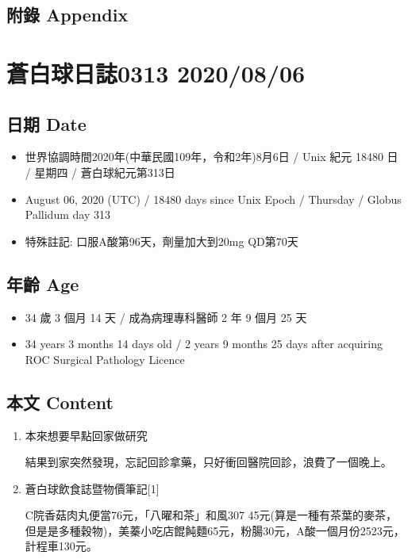 \documentclass[
]{article}
\providecommand{\tightlist}{%
  \setlength{\itemsep}{0pt}\setlength{\parskip}{0pt}}
\begin{document}
\hypertarget{ux9644ux9304-appendix-4}{%
\subsection{附錄 Appendix}\label{ux9644ux9304-appendix-4}}

\hypertarget{ux84bcux767dux7403ux65e5ux8a8c0313-20200806}{%
\section{蒼白球日誌0313
2020/08/06}\label{ux84bcux767dux7403ux65e5ux8a8c0313-20200806}}

\hypertarget{ux65e5ux671f-date-5}{%
\subsection{日期 Date}\label{ux65e5ux671f-date-5}}

\begin{itemize}
\tightlist
\item
  世界協調時間2020年(中華民國109年，令和2年)8月6日 / Unix 紀元 18480 日
  / 星期四 / 蒼白球紀元第313日
\item
  August 06, 2020 (UTC) / 18480 days since Unix Epoch / Thursday /
  Globus Pallidum day 313
\item
  特殊註記: 口服A酸第96天，劑量加大到20mg QD第70天
\end{itemize}

\hypertarget{ux5e74ux9f61-age-5}{%
\subsection{年齡 Age}\label{ux5e74ux9f61-age-5}}

\begin{itemize}
\tightlist
\item
  34 歲 3 個月 14 天 / 成為病理專科醫師 2 年 9 個月 25 天
\item
  34 years 3 months 14 days old / 2 years 9 months 25 days after
  acquiring ROC Surgical Pathology Licence
\end{itemize}

\hypertarget{ux672cux6587-content-5}{%
\subsection{本文 Content}\label{ux672cux6587-content-5}}

\begin{enumerate}
\def\labelenumi{\arabic{enumi}.}
\item
  本來想要早點回家做研究

  結果到家突然發現，忘記回診拿藥，只好衝回醫院回診，浪費了一個晚上。
\item
  蒼白球飲食誌暨物價筆記{[}1{]}

  C院香菇肉丸便當76元，「八曜和茶」和風307
  45元(算是一種有茶葉的麥茶，但是是多種穀物)，美蓁小吃店餛飩麵65元，粉腸30元，A酸一個月份2523元，計程車130元。
\end{enumerate}
\end{document}
